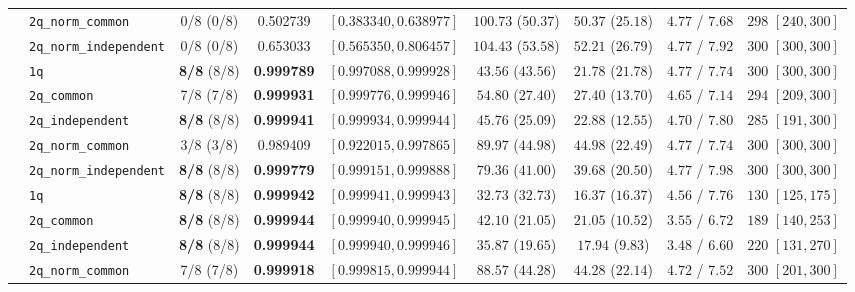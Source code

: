\documentclass[11pt,a4paper]{article}
\begin{document}
\begin{table}[H]
{\begin{tabular}{llccccccc}
 & \texttt{2q\_norm\_common} & 0/8 (0/8) & 0.502739 & $[0.383340, 0.638977]$ & $100.73$ ($50.37$) & $50.37$ ($25.18$) & $4.77$ / $7.68$ & $298$ $[240, 300]$ \\
 & \texttt{2q\_norm\_independent} & 0/8 (0/8) & 0.653033 & $[0.565350, 0.806457]$ & $104.43$ ($53.58$) & $52.21$ ($26.79$) & $4.77$ / $7.92$ & $300$ $[300, 300]$ \\
\midrule
{}
 & \texttt{1q} & \textbf{8/8} (8/8) & \textbf{0.999789} & $[0.997088, 0.999928]$ & $43.56$ ($43.56$) & $21.78$ ($21.78$) & $4.77$ / $7.74$ & $300$ $[300, 300]$ \\
 & \texttt{2q\_common} & 7/8 (7/8) & \textbf{0.999931} & $[0.999776, 0.999946]$ & $54.80$ ($27.40$) & $27.40$ ($13.70$) & $4.65$ / $7.14$ & $294$ $[209, 300]$ \\
 & \texttt{2q\_independent} & \textbf{8/8} (8/8) & \textbf{0.999941} & $[0.999934, 0.999944]$ & $45.76$ ($25.09$) & $22.88$ ($12.55$) & $4.70$ / $7.80$ & $285$ $[191, 300]$ \\
 & \texttt{2q\_norm\_common} & 3/8 (3/8) & 0.989409 & $[0.922015, 0.997865]$ & $89.97$ ($44.98$) & $44.98$ ($22.49$) & $4.77$ / $7.74$ & $300$ $[300, 300]$ \\
 & \texttt{2q\_norm\_independent} & \textbf{8/8} (8/8) & \textbf{0.999779} & $[0.999151, 0.999888]$ & $79.36$ ($41.00$) & $39.68$ ($20.50$) & $4.77$ / $7.98$ & $300$ $[300, 300]$ \\
\midrule
{}
 & \texttt{1q} & \textbf{8/8} (8/8) & \textbf{0.999942} & $[0.999941, 0.999943]$ & $32.73$ ($32.73$) & $16.37$ ($16.37$) & $4.56$ / $7.76$ & $130$ $[125, 175]$ \\
 & \texttt{2q\_common} & \textbf{8/8} (8/8) & \textbf{0.999944} & $[0.999940, 0.999945]$ & $42.10$ ($21.05$) & $21.05$ ($10.52$) & $3.55$ / $6.72$ & $189$ $[140, 253]$ \\
 & \texttt{2q\_independent} & \textbf{8/8} (8/8) & \textbf{0.999944} & $[0.999940, 0.999946]$ & $35.87$ ($19.65$) & $17.94$ ($9.83$) & $3.48$ / $6.60$ & $220$ $[131, 270]$ \\
 & \texttt{2q\_norm\_common} & 7/8 (7/8) & \textbf{0.999918} & $[0.999815, 0.999944]$ & $88.57$ ($44.28$) & $44.28$ ($22.14$) & $4.72$ / $7.52$ & $300$ $[201, 300]$ \\

\end{tabular}}
\end{table}
\end{document}
